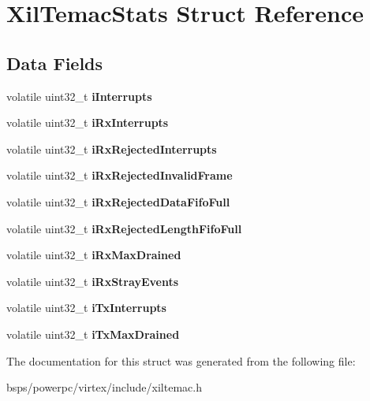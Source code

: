 \hypertarget{structXilTemacStats}{}\section{Xil\+Temac\+Stats Struct Reference}
\label{structXilTemacStats}
\subsection*{Data Fields}
\begin{DoxyCompactItemize}
\item 
\mbox{\label{structXilTemacStats_a48658c370595ed046415586d2b0f8dbb}} 
volatile uint32\+\_\+t {\bfseries i\+Interrupts}
\item 
\mbox{\label{structXilTemacStats_a9a821df907c12b9eac71f01e154a7806}} 
volatile uint32\+\_\+t {\bfseries i\+Rx\+Interrupts}
\item 
\mbox{\label{structXilTemacStats_a7ad27215be6e51f105c8a8c36c197a66}} 
volatile uint32\+\_\+t {\bfseries i\+Rx\+Rejected\+Interrupts}
\item 
\mbox{\label{structXilTemacStats_a7135451167fa52e973358660de3d51af}} 
volatile uint32\+\_\+t {\bfseries i\+Rx\+Rejected\+Invalid\+Frame}
\item 
\mbox{\label{structXilTemacStats_ac3ebc3169c1199969ba61aded8a39db5}} 
volatile uint32\+\_\+t {\bfseries i\+Rx\+Rejected\+Data\+Fifo\+Full}
\item 
\mbox{\label{structXilTemacStats_ad02dfa400a45dff96bfed6a1e910e8b9}} 
volatile uint32\+\_\+t {\bfseries i\+Rx\+Rejected\+Length\+Fifo\+Full}
\item 
\mbox{\label{structXilTemacStats_ab32ced823d99776026230ed0543f5a3f}} 
volatile uint32\+\_\+t {\bfseries i\+Rx\+Max\+Drained}
\item 
\mbox{\label{structXilTemacStats_adc38de865dea12cda0d20fa24ae7ec85}} 
volatile uint32\+\_\+t {\bfseries i\+Rx\+Stray\+Events}
\item 
\mbox{\label{structXilTemacStats_ae8d6d4259a453e1ec454a6ff4573a4c4}} 
volatile uint32\+\_\+t {\bfseries i\+Tx\+Interrupts}
\item 
\mbox{\label{structXilTemacStats_adb6aa536471aa1771ac9dea11de723cd}} 
volatile uint32\+\_\+t {\bfseries i\+Tx\+Max\+Drained}
\end{DoxyCompactItemize}


The documentation for this struct was generated from the following file\+:\begin{DoxyCompactItemize}
\item 
bsps/powerpc/virtex/include/xiltemac.\+h\end{DoxyCompactItemize}
